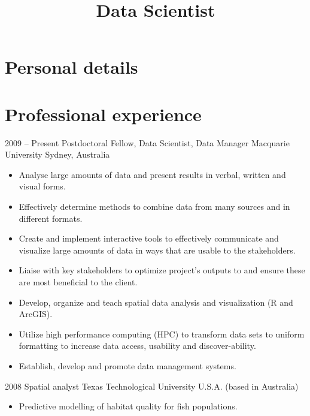 \documentclass[11pt,a4paper,sans]{moderncv}        %
\title{Data Scientist}                               %
\begin{document}
\makecvtitle

\section{Personal details}

\section{Professional experience}

\cventry
  {2009 -- Present}
  {Postdoctoral Fellow, Data Scientist, Data Manager}
  {Macquarie University}  
  {Sydney, Australia}
  {}
  {\begin{itemize}
  \item Analyse large amounts of data and present results in verbal, written and visual forms.
  \item Effectively determine methods to combine data from many sources and in different formats.
  \item Create and implement interactive tools to effectively communicate and visualize large amounts of data in ways that are usable to the stakeholders.
  \item Liaise with key stakeholders to optimize project’s outputs to and ensure these are most beneficial to the client.
  \item Develop, organize and teach spatial data analysis and visualization (R and ArcGIS).
  \item Utilize high performance computing (HPC) to transform data sets to uniform formatting to increase data access, usability and discover-ability.
  \item Establish, develop and promote data management systems.
  \end{itemize}
  }

\cventry
  {2008}
  {Spatial analyst}
  {Texas Technological University}
  {U.S.A. (based in Australia)}
  {}
  {\begin{itemize}
  \item Predictive modelling of habitat quality for fish populations.
  \end{itemize}
  }
  
\end{document}
